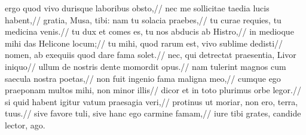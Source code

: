ergo quod vivo durisque laboribus obsto,//
     nec me sollicitae taedia lucis habent,//
gratia, Musa, tibi: nam tu solacia praebes,//
     tu curae requies, tu medicina venis.//
tu dux et comes es, tu nos abducis ab Histro,//
     in medioque mihi das Helicone locum;//
tu mihi, quod rarum est, vivo sublime dedisti//
     nomen, ab exequiis quod dare fama solet.//
nec, qui detrectat praesentia, Livor iniquo//
     ullum de nostris dente momordit opus.//
nam tulerint magnos cum saecula nostra poetas,//
     non fuit ingenio fama maligna meo,//
cumque ego praeponam multos mihi, non minor illis//
     dicor et in toto plurimus orbe legor.//
si quid habent igitur vatum praesagia veri,//
     protinus ut moriar, non ero, terra, tuus.//
sive favore tuli, sive hanc ego carmine famam,//
     iure tibi grates, candide lector, ago.
